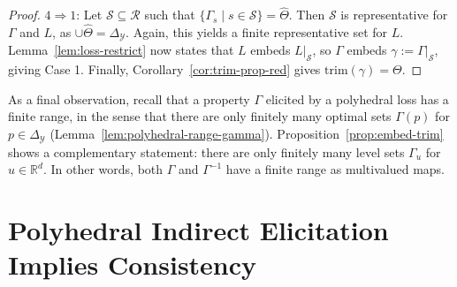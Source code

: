 \documentclass[11pt]{article}
\newcommand{\reals}{\mathbb{R}}
\newcommand{\simplex}{\Delta_\Y}
\newcommand{\R}{\mathcal{R}}
\newcommand{\Sc}{\mathcal{S}}
\newcommand{\U}{\mathcal{U}}
\newcommand{\Y}{\mathcal{Y}}
\newcommand{\trimred}{\mathrm{trim}}
\begin{document}
\begin{proof}
  $4 \Rightarrow 1$:
  Let $\Sc\subseteq\R$ such that $\{\Gamma_s \mid s\in\Sc\} = \hat \Theta$.
  Then $\Sc$ is representative for $\Gamma$ and $L$, as $\cup\hat\Theta = \simplex$.
  Again, this yields a finite representative set for $L$.
  Lemma~\ref{lem:loss-restrict} now states that $L$ embeds $L|_\Sc$, so $\Gamma$ embeds $\gamma := \Gamma|_\Sc$, giving Case 1.
  Finally, Corollary~\ref{cor:trim-prop-red} gives $\trimred(\gamma) = \Theta$.
\end{proof}

As a final observation, recall that a property $\Gamma$ elicited by a polyhedral loss has a finite range, in the sense that there are only finitely many optimal sets $\Gamma(p)$ for $p\in\simplex$ (Lemma~\ref{lem:polyhedral-range-gamma}).
Proposition~\ref{prop:embed-trim} shows a complementary statement: there are only finitely many level sets $\Gamma_u$ for $u\in\reals^d$.
In other words, both $\Gamma$ and $\Gamma^{-1}$ have a finite range as multivalued maps.

\section{Polyhedral Indirect Elicitation Implies Consistency}
\label{sec:poly-ie-consistency}
\end{document}

